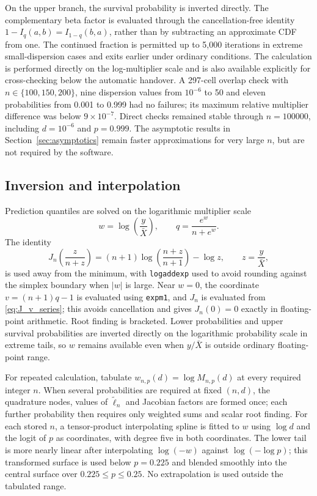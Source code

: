 \documentclass[11pt]{article}
\theoremstyle{remark}
\begin{document}
On the upper branch, the survival probability is inverted directly. The complementary beta factor is evaluated through the cancellation-free identity $1-I_q(a,b)=I_{1-q}(b,a)$, rather than by subtracting an approximate CDF from one. The continued fraction is permitted up to 5,000 iterations in extreme small-dispersion cases and exits earlier under ordinary conditions. The calculation is performed directly on the log-multiplier scale and is also available explicitly for cross-checking below the automatic handover. A 297-cell overlap check with $n\in\{100,150,200\}$, nine dispersion values from $10^{-6}$ to 50 and eleven probabilities from 0.001 to 0.999 had no failures; its maximum relative multiplier difference was below $9\times10^{-7}$. Direct checks remained stable through $n=100000$, including $d=10^{-6}$ and $p=0.999$. The asymptotic results in Section~\ref{sec:asymptotics} remain faster approximations for very large $n$, but are not required by the software.

\subsection{Inversion and interpolation}

Prediction quantiles are solved on the logarithmic multiplier scale
\begin{equation}
 w=\log\left(\frac{y}{\bar X}\right),
 \qquad
 q=\frac{e^w}{n+e^w}.
 \label{eq:w_scale}
\end{equation}
The identity
\begin{equation}
 J_n\left(\frac{z}{n+z}\right)
 =(n+1)\log\left(\frac{n+z}{n+1}\right)-\log z,
 \qquad z=\frac y{\bar X},
 \label{eq:J_z}
\end{equation}
is used away from the minimum, with \texttt{logaddexp} used to avoid rounding against the simplex boundary when $|w|$ is large. Near $w=0$, the coordinate $v=(n+1)q-1$ is evaluated using \texttt{expm1}, and $J_n$ is evaluated from \eqref{eq:J_v_series}; this avoids cancellation and gives $J_n(0)=0$ exactly in floating-point arithmetic. Root finding is bracketed. Lower probabilities and upper survival probabilities are inverted directly on the logarithmic probability scale in extreme tails, so $w$ remains available even when $y/\bar X$ is outside ordinary floating-point range.

For repeated calculation, tabulate $w_{n,p}(d)=\log M_{n,p}(d)$ at every required integer $n$. When several probabilities are required at fixed $(n,d)$, the quadrature nodes, values of $\widetilde\ell_n$ and Jacobian factors are formed once; each further probability then requires only weighted sums and scalar root finding. For each stored $n$, a tensor-product interpolating spline is fitted to $w$ using $\log d$ and the logit of $p$ as coordinates, with degree five in both coordinates. The lower tail is more nearly linear after interpolating $\log(-w)$ against $\log(-\log p)$; this transformed surface is used below $p=0.225$ and blended smoothly into the central surface over $0.225\le p\le0.25$. No extrapolation is used outside the tabulated range.
\end{document}
